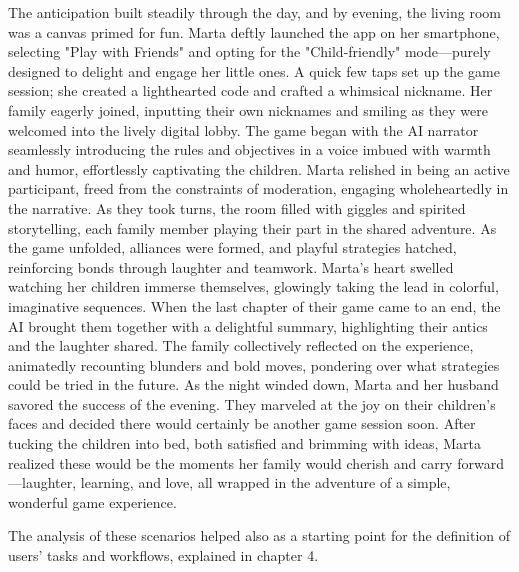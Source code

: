 \documentclass[12pt]{article}
\begin{document}
\begin{itemize}
{    The anticipation built steadily through the day, and by evening, the living room was a canvas primed for fun. Marta deftly launched the app on her smartphone, selecting "Play with Friends" and opting for the "Child-friendly" mode—purely designed to delight and engage her little ones. A quick few taps set up the game session; she created a lighthearted code and crafted a whimsical nickname. Her family eagerly joined, inputting their own nicknames and smiling as they were welcomed into the lively digital lobby.  
    The game began with the AI narrator seamlessly introducing the rules and objectives in a voice imbued with warmth and humor, effortlessly captivating the children. Marta relished in being an active participant, freed from the constraints of moderation, engaging wholeheartedly in the narrative. As they took turns, the room filled with giggles and spirited storytelling, each family member playing their part in the shared adventure.  
    As the game unfolded, alliances were formed, and playful strategies hatched, reinforcing bonds through laughter and teamwork. Marta’s heart swelled watching her children immerse themselves, glowingly taking the lead in colorful, imaginative sequences.
    When the last chapter of their game came to an end, the AI brought them together with a delightful summary, highlighting their antics and the laughter shared. The family collectively reflected on the experience, animatedly recounting blunders and bold moves, pondering over what strategies could be tried in the future.  
    As the night winded down, Marta and her husband savored the success of the evening. They marveled at the joy on their children’s faces and decided there would certainly be another game session soon. After tucking the children into bed, both satisfied and brimming with ideas, Marta realized these would be the moments her family would cherish and carry forward—laughter, learning, and love, all wrapped in the adventure of a simple, wonderful game experience.}
    \end{itemize}
The analysis of these scenarios helped also as a starting point for the definition of users' tasks and workflows, explained in chapter 4.
\end{document}

